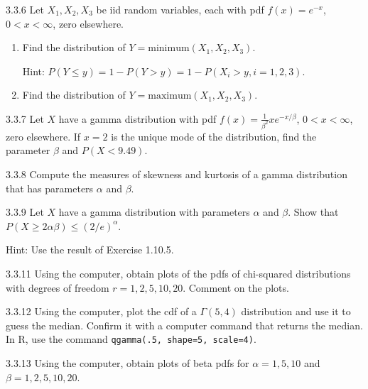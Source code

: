 \begin{exercise}{3.3.6}
Let $X_1, X_2, X_3$ be iid random variables, each with pdf $f(x) = e^{-x}$, $0 < x < \infty$, zero elsewhere.
\begin{enumerate}
\item Find the distribution of $Y = \text{minimum}(X_1, X_2, X_3)$.

Hint: $P(Y \leq y) = 1 - P(Y > y) = 1 - P(X_i > y, i = 1, 2, 3)$.
\item Find the distribution of $Y = \text{maximum}(X_1, X_2, X_3)$.
\end{enumerate}
\end{exercise}

\begin{exercise}{3.3.7}
Let $X$ have a gamma distribution with pdf $f(x) = \frac{1}{\beta^2}xe^{-x/\beta}$, $0 < x < \infty$, zero elsewhere. If $x = 2$ is the unique mode of the distribution, find the parameter $\beta$ and $P(X < 9.49)$.
\end{exercise}

\begin{exercise}{3.3.8}
Compute the measures of skewness and kurtosis of a gamma distribution that has parameters $\alpha$ and $\beta$.
\end{exercise}

\begin{exercise}{3.3.9}
Let $X$ have a gamma distribution with parameters $\alpha$ and $\beta$. Show that $P(X \geq 2\alpha\beta) \leq (2/e)^{\alpha}$.

Hint: Use the result of Exercise 1.10.5.
\end{exercise}

\begin{exercise}{3.3.11}
Using the computer, obtain plots of the pdfs of chi-squared distributions with degrees of freedom $r = 1, 2, 5, 10, 20$. Comment on the plots.
\end{exercise}

\begin{exercise}{3.3.12}
Using the computer, plot the cdf of a $\Gamma(5,4)$ distribution and use it to guess the median. Confirm it with a computer command that returns the median. In R, use the command \texttt{qgamma(.5, shape=5, scale=4)}.
\end{exercise}

\begin{exercise}{3.3.13}
Using the computer, obtain plots of beta pdfs for $\alpha = 1, 5, 10$ and $\beta = 1, 2, 5, 10, 20$.
\end{exercise}

